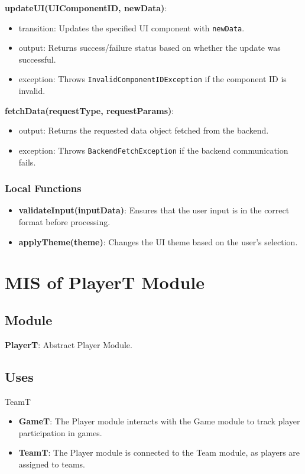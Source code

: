 \documentclass[12pt, titlepage]{article}
\begin{document}
\noindent \textbf{updateUI(UIComponentID, newData)}:
\begin{itemize}
    \item transition: Updates the specified UI component with \texttt{newData}.
    \item output: Returns success/failure status based on whether the update was successful.
    \item exception: Throws \texttt{InvalidComponentIDException} if the component ID is invalid.
\end{itemize}

\noindent \textbf{fetchData(requestType, requestParams)}:
\begin{itemize}
    \item output: Returns the requested data object fetched from the backend.
    \item exception: Throws \texttt{BackendFetchException} if the backend communication fails.
\end{itemize}

\subsubsection{Local Functions}

\begin{itemize}
    \item \textbf{validateInput(inputData)}: Ensures that the user input is in the correct format before processing.
    \item \textbf{applyTheme(theme)}: Changes the UI theme based on the user's selection.
\end{itemize}

\newpage

\section{MIS of PlayerT Module} \label{PlayerTModule}

\subsection{Module}
\textbf{PlayerT}: Abstract Player Module. 
\subsection{Uses}
TeamT
\begin{itemize}
  \item \textbf{GameT}: The Player module interacts with the Game module to track player participation in games.
  \item \textbf{TeamT}: The Player module is connected to the Team module, as players are assigned to teams.
\end{itemize}
\end{document}
